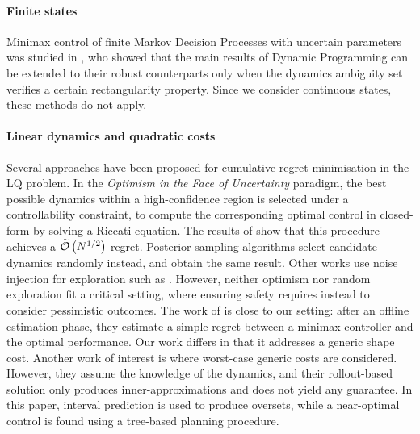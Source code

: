 \documentclass{article}
\begin{document}
\paragraph{Finite states} Minimax control of finite Markov Decision Processes with uncertain parameters was studied in \citep{Iyengar2005,Nilim2005,Wiesemann2013}, who showed that the main results of Dynamic Programming can be extended to their robust counterparts only when the dynamics ambiguity set verifies a certain rectangularity property. Since we consider continuous states, these methods do not apply.

\paragraph{Linear dynamics and quadratic costs} Several approaches have been proposed for cumulative regret minimisation in the LQ problem. In the \emph{Optimism in the Face of Uncertainty} paradigm, the best possible dynamics within a high-confidence region is selected under a controllability constraint, to compute the corresponding optimal control in closed-form by solving a Riccati equation. The results of 	\citep{abbasi-yadkori11a,Ibrahimi2013,Faradonbeh2017} show that this procedure achieves a $\widetilde{\mathcal{O}}\left(N^{1/2}\right)$ regret. Posterior sampling algorithms \citep{Ouyang2017,abeille18a} select candidate dynamics randomly instead, and obtain the same result. Other works use noise injection for exploration such as \citep{Dean2017,Dean2018}. However, neither optimism nor random exploration fit a critical setting, where ensuring safety requires instead to consider pessimistic outcomes. The work of \citet{Dean2017} is close to our setting: after an offline estimation phase, they estimate a simple regret between a minimax controller and the optimal performance. Our work differs in that it addresses a generic shape cost. 
Another work of interest is \citep{Rosolia2019} where worst-case generic costs are considered. However, they assume the knowledge of the dynamics, and their rollout-based solution only produces inner-approximations and does not yield any guarantee. In this paper, interval prediction is used to produce oversets, while a near-optimal control is found using a tree-based planning procedure.
\end{document}

